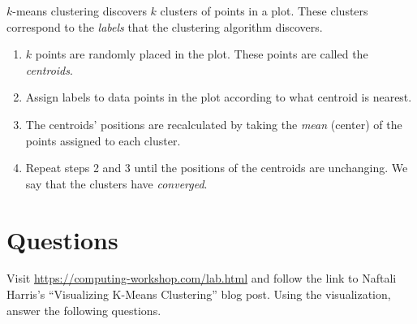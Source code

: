 \documentclass[11pt]{article}
\title{\vspace{-3em}\kmc}
\author{Computing Workshop: Machine Learning}
\date{Fall 2018}
\newcommand{\kmc}{$k$-means clustering}
\begin{document}
\maketitle

\kmc{} discovers $k$ clusters of points in a plot. These clusters correspond to
the \emph{labels} that the clustering algorithm discovers.
\begin{enumerate}
\item
  $k$ points are randomly placed in the plot. These points are called the
  \emph{centroids}.
\item
  Assign labels to data points in the plot according to what centroid is nearest.
\item
  The centroids' positions are recalculated by taking the \emph{mean} (center)
  of the points assigned to each cluster.
\item
  Repeat steps 2 and 3 until the positions of the centroids are unchanging.
  We say that the clusters have \emph{converged}.
\end{enumerate}

\section*{Questions}

Visit \url{https://computing-workshop.com/lab.html} and follow the link to
Naftali Harris's ``Visualizing K-Means Clustering'' blog post.
Using the visualization, answer the following questions.
\end{document}
